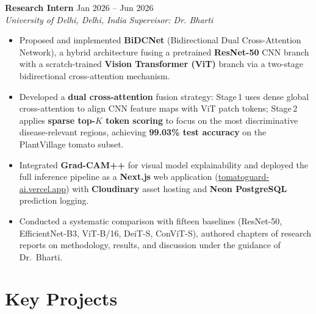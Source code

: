 \documentclass[11pt,letterpaper]{article}
\begin{document}
\textbf{Research Intern} \hfill Jan 2026 -- Jun 2026 \\
\textit{University of Delhi, Delhi, India} \hfill \textit{Supervisor: Dr. Bharti}
\begin{itemize}
  \item Proposed and implemented \textbf{BiDCNet} (Bidirectional Dual Cross-Attention Network), a hybrid architecture fusing a pretrained \textbf{ResNet-50} CNN branch with a scratch-trained \textbf{Vision Transformer (ViT)} branch via a two-stage bidirectional cross-attention mechanism.
  \item Developed a \textbf{dual cross-attention} fusion strategy: Stage\,1 uses dense global cross-attention to align CNN feature maps with ViT patch tokens; Stage\,2 applies \textbf{sparse top-$K$ token scoring} to focus on the most discriminative disease-relevant regions, achieving \textbf{99.03\% test accuracy} on the PlantVillage tomato subset.
  \item Integrated \textbf{Grad-CAM++} for visual model explainability and deployed the full inference pipeline as a \textbf{Next.js} web application (\href{https://tomatoguard-ai.vercel.app}{tomatoguard-ai.vercel.app}) with \textbf{Cloudinary} asset hosting and \textbf{Neon PostgreSQL} prediction logging.
  \item Conducted a systematic comparison with fifteen baselines (ResNet-50, EfficientNet-B3, ViT-B/16, DeiT-S, ConViT-S), authored chapters of research reports on methodology, results, and discussion under the guidance of Dr.~Bharti.
\end{itemize}

\vspace{4pt}

\section{Key Projects}
\end{document}

